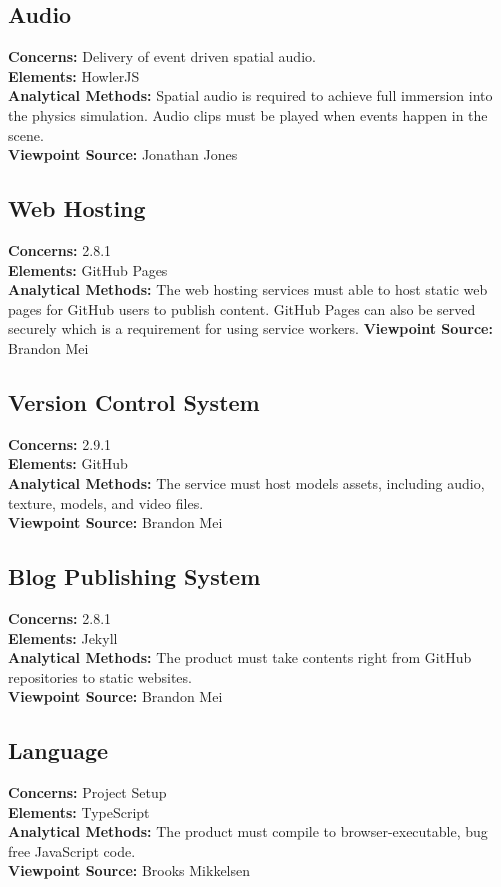 \documentclass[onecolumn, draftclsnofoot,10pt, compsoc]{IEEEtran}
\begin{document}
\subsection{Audio}
\textbf{Concerns:} Delivery of event driven spatial audio.\\
\textbf{Elements:} HowlerJS\\
\textbf{Analytical Methods:} Spatial audio is required to achieve full immersion into the physics simulation. Audio clips must be played when events happen in the scene.\\
\textbf{Viewpoint Source:} Jonathan Jones

\subsection{Web Hosting}
\textbf{Concerns:} 2.8.1\\
\textbf{Elements:} GitHub Pages\\
\textbf{Analytical Methods:} The web hosting services must able to host static web pages for GitHub users to publish content. GitHub Pages can also be served securely which is a requirement for using service workers.
\textbf{Viewpoint Source:} Brandon Mei

\subsection{Version Control System}
\textbf{Concerns:} 2.9.1\\
\textbf{Elements:} GitHub\\
\textbf{Analytical Methods:} The service must host models assets, including audio, texture, models, and video files.\\
\textbf{Viewpoint Source:} Brandon Mei

\subsection{Blog Publishing System}
\textbf{Concerns:} 2.8.1\\
\textbf{Elements:} Jekyll\\
\textbf{Analytical Methods:} The product must take contents right from GitHub repositories to static websites.\\
\textbf{Viewpoint Source:} Brandon Mei

\subsection{Language}
\textbf{Concerns:} Project Setup\\
\textbf{Elements:} TypeScript\\
\textbf{Analytical Methods:} The product must compile to browser-executable, bug free JavaScript code.\\ 
\textbf{Viewpoint Source:} Brooks Mikkelsen
\end{document}
